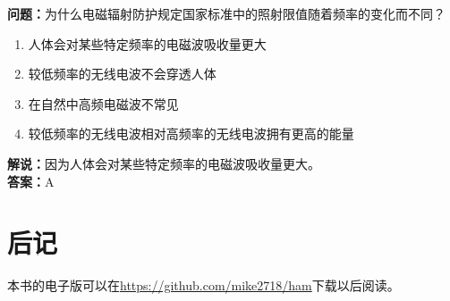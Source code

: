 \documentclass[UTF8]{ctexbook}
\begin{document}
\textbf{问题：}为什么电磁辐射防护规定国家标准中的照射限值随着频率的变化而不同？
\begin{enumerate}[label=\Alph*), leftmargin=3em]
  \item 人体会对某些特定频率的电磁波吸收量更大
  \item 较低频率的无线电波不会穿透人体
  \item 在自然中高频电磁波不常见
  \item 较低频率的无线电波相对高频率的无线电波拥有更高的能量
\end{enumerate}
\textbf{解说：}因为人体会对某些特定频率的电磁波吸收量更大。\\
\textbf{答案：}A

\chapter*{后记}

本书的电子版可以在\url{https://github.com/mike2718/ham}下载以后阅读。

\end{document}
